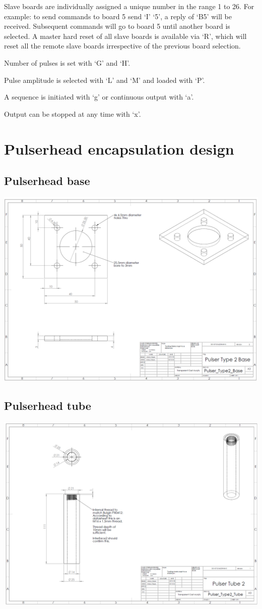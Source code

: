 Slave boards are individually assigned a unique number in the range 1 to 26. For example: to send commands to board 5 send ‘I’ ‘5’, a reply of ‘B5’ will be received. Subsequent commands will go to board 5 until another board is selected. A master hard reset of all slave boards is available via ‘R’, which will reset all the remote slave boards irrespective of the previous board selection.

Number of pulses is set with ‘G’ and ‘H’.

Pulse amplitude is selected with ‘L’ and  ‘M’ and loaded with ‘P’.

A sequence is initiated with ‘g’ or  continuous output with ‘a’.               

Output can be stopped at any time with ‘x’.
%
%
\section{Pulserhead encapsulation design}
\label{app:pulserhead_design}
\subsection*{Pulserhead base}
\includegraphics[width=\linewidth]{figures/pulserhead_base.png}
\subsection*{Pulserhead tube}
\includegraphics[width=\linewidth]{figures/pulserhead_tube.png}
